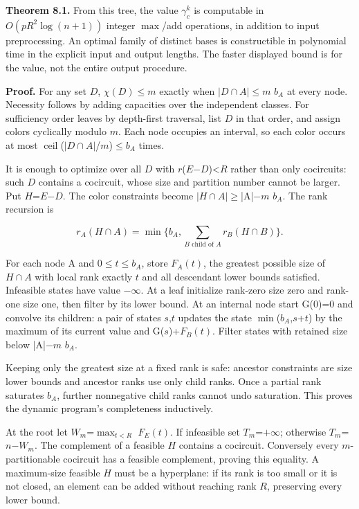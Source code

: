 \documentclass[11pt]{article}
\begin{document}
\textbf{Theorem 8.1.} From this tree, the value \(\gamma_c^k\) is computable in \(O(pR^2\log(n+1))\) integer \(\max\)/add operations, in addition to input preprocessing. An optimal family of distinct bases is constructible in polynomial time in the explicit input and output lengths. The faster displayed bound is for the value, not the entire output procedure.

\textbf{Proof.} For any set \(D\), \(\chi(D)\)\(\le\)\(m\) exactly when \(|D\cap A|\)\(\le\)\(m\) \(b_A\) at every node. Necessity follows by adding capacities over the independent classes. For sufficiency order leaves by depth-first traversal, list \(D\) in that order, and assign colors cyclically modulo \(m\). Each node occupies an interval, so each color occurs at most \(\operatorname{ceil}\)(\(|D\cap A|\)/\(m\))\(\le\)\(b_A\) times.

It is enough to optimize over all \(D\) with \(r\)(\(E\)\ensuremath{-}\(D\))<\(R\) rather than only cocircuits: such \(D\) contains a cocircuit, whose size and partition number cannot be larger. Put \(H\)=\(E\)\ensuremath{-}\(D\). The color constraints become \(|H\cap A|\)\(\ge\)|A|\ensuremath{-}\(m\) \(b_A\). The rank recursion is

\[
r_A(H\cap A)=\min\{b_A,\sum_{B\text{ child of }A}r_B(H\cap B)\}.
\]

For each node A and \(0\le t\le b_A\), store \(F_A(t)\), the greatest possible size of \(H\cap A\) with local rank exactly \(t\) and all descendant lower bounds satisfied. Infeasible states have value \(-\infty\). At a leaf initialize rank-zero size zero and rank-one size one, then filter by its lower bound. At an internal node start G(0)=0 and convolve its children: a pair of states \(s\),\(t\) updates the state \(\min\)(\(b_A\),\(s\)+\(t\)) by the maximum of its current value and G(\(s\))+\(F_B(t)\). Filter states with retained size below |A|\ensuremath{-}\(m\) \(b_A\).

Keeping only the greatest size at a fixed rank is safe: ancestor constraints are size lower bounds and ancestor ranks use only child ranks. Once a partial rank saturates \(b_A\), further nonnegative child ranks cannot undo saturation. This proves the dynamic program's completeness inductively.

At the root let \(W_m\)=\(\max_{t<R}\) \(F_E(t)\). If infeasible set \(T_m\)=\(+\infty\); otherwise \(T_m\)=\(n\)\ensuremath{-}\(W_m\). The complement of a feasible \(H\) contains a cocircuit. Conversely every \(m\)-partitionable cocircuit has a feasible complement, proving this equality. A maximum-size feasible \(H\) must be a hyperplane: if its rank is too small or it is not closed, an element can be added without reaching rank \(R\), preserving every lower bound.
\end{document}
